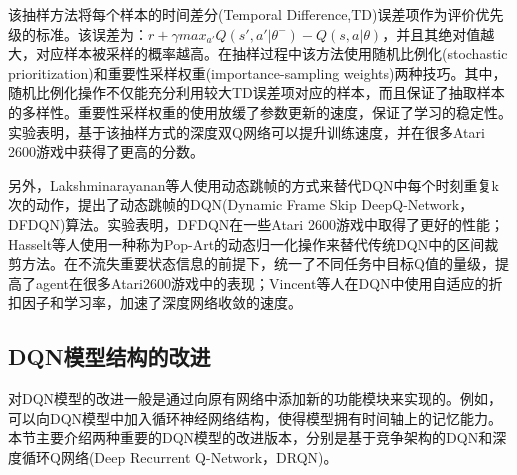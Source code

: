 \documentclass[bachelor]{thesis-uestc}
\begin{document}
	该抽样方法将每个样本的时间差分(Temporal Difference,TD)误差项作为评价优先级的标准。该误差为：$r+\gamma max_{a'}Q(s',a'|\theta^-)-Q(s,a|\theta)$，并且其绝对值越大，对应样本被采样的概率越高。在抽样过程中该方法使用随机比例化(stochastic prioritization)和重要性采样权重(importance-sampling weights)两种技巧。其中，随机比例化操作不仅能充分利用较大TD误差项对应的样本，而且保证了抽取样本的多样性。重要性采样权重的使用放缓了参数更新的速度，保证了学习的稳定性。实验表明，基于该抽样方式的深度双Q网络可以提升训练速度，并在很多Atari 2600游戏中获得了更高的分数。
	
	另外，Lakshminarayanan等人使用动态跳帧的方式来替代DQN中每个时刻重复k次的动作，提出了动态跳帧的DQN(Dynamic Frame Skip DeepQ-Network，DFDQN)算法。实验表明，DFDQN在一些Atari 2600游戏中取得了更好的性能；Hasselt等人使用一种称为Pop-Art的动态归一化操作来替代传统DQN中的区间裁剪方法。在不流失重要状态信息的前提下，统一了不同任务中目标Q值的量级，提高了agent在很多Atari2600游戏中的表现；Vincent等人在DQN中使用自适应的折扣因子和学习率，加速了深度网络收敛的速度。
	
	\subsection{DQN模型结构的改进}
	对DQN模型的改进一般是通过向原有网络中添加新的功能模块来实现的。例如，可以向DQN模型中加入循环神经网络结构，使得模型拥有时间轴上的记忆能力。本节主要介绍两种重要的DQN模型的改进版本，分别是基于竞争架构的DQN和深度循环Q网络(Deep Recurrent Q-Network，DRQN)。
\end{document}
